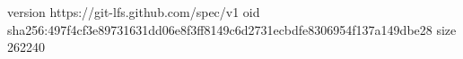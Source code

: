 version https://git-lfs.github.com/spec/v1
oid sha256:497f4cf3e89731631dd06e8f3ff8149c6d2731ecbdfe8306954f137a149dbe28
size 262240
